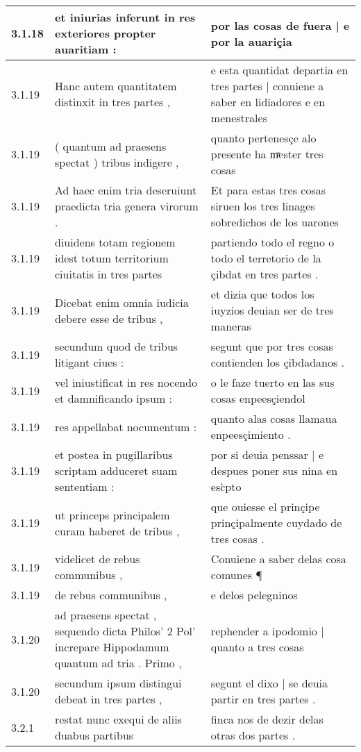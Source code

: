 \begin{tabular}{|p{1cm}|p{6.5cm}|p{6.5cm}|}
3.1.18 & et iniurias inferunt in res exteriores propter auaritiam : & por las cosas de fuera | e por la auariçia \\\hline
3.1.19 & Hanc autem quantitatem distinxit in tres partes , & e esta quantidat departia en tres partes | conuiene a saber en lidiadores e en menestrales \\\hline
3.1.19 & ( quantum ad praesens spectat ) tribus indigere , & quanto pertenesçe alo presente ha mͣester tres cosas \\\hline
3.1.19 & Ad haec enim tria deseruiunt praedicta tria genera virorum . & Et para estas tres cosas siruen los tres linages sobredichos de los uarones \\\hline
3.1.19 & diuidens totam regionem idest totum territorium ciuitatis in tres partes & partiendo todo el regno o todo el terretorio de la çibdat en tres partes . \\\hline
3.1.19 & Dicebat enim omnia iudicia debere esse de tribus , & et dizia que todos los iuyzios deuian ser de tres maneras \\\hline
3.1.19 & secundum quod de tribus litigant ciues : & segunt que por tres cosas contienden los çibdadanos . \\\hline
3.1.19 & vel iniustificat in res nocendo et damnificando ipsum : & o le faze tuerto en las sus cosas enpeesçiendol \\\hline
3.1.19 & res appellabat nocumentum : & quanto alas cosas llamaua enpeesçimiento . \\\hline
3.1.19 & et postea in pugillaribus scriptam adduceret suam sententiam : & por si deuia penssar | e despues poner sus nina en esc̀pto \\\hline
3.1.19 & ut princeps principalem curam haberet de tribus , & que ouiesse el prinçipe prinçipalmente cuydado de tres cosas . \\\hline
3.1.19 & videlicet de rebus communibus , & Conuiene a saber delas cosa comunes ¶ \\\hline
3.1.19 & de rebus communibus , & e delos pelegninos \\\hline
3.1.20 & ad praesens spectat , sequendo dicta Philos’ 2 Pol’ increpare Hippodamum quantum ad tria . Primo , & rephender a ipodomio | quanto a tres cosas \\\hline
3.1.20 & secundum ipsum distingui debeat in tres partes , & segunt el dixo | se deuia partir en tres partes . \\\hline
3.2.1 & restat nunc exequi de aliis duabus partibus & finca nos de dezir delas otras dos partes . \\\hline

\end{tabular}
